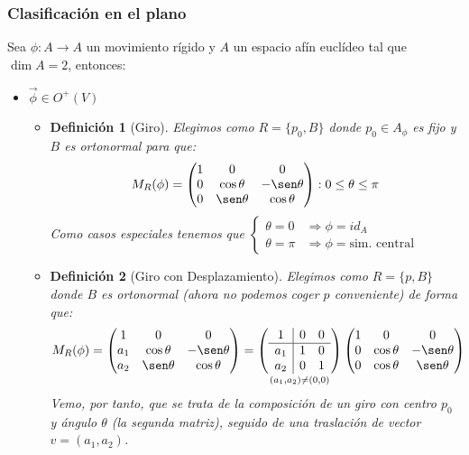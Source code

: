 \documentclass[10pt,a4paper,openright]{book}
\theoremstyle{break}
\newtheorem*{defi}{Definición}
\begin{document}
\subsubsection{Clasificación en el plano}
Sea $\phi : A \to A $ un movimiento rígido y $A$ un espacio afín euclídeo tal que $\dim A = 2$, entonces:
\begin{itemize}
\item $\boxed{\vec{\phi} \in O^+(V)}$
	\begin{itemize}
	\item {}
	
	\begin{defi}[Giro]
	Elegimos como $R=\{p_0, B\}$ donde $p_0\in A_\phi$ es fijo y $B$ es ortonormal para que:
	$$M_R (\phi) = \begin{pmatrix} 1 & 0 & 0 \\ 0 & \cos\theta & -\sen\theta \\ 0 & \sen\theta & \cos\theta \\ \end{pmatrix} : 0 \leq \theta \leq \pi$$
 	Como casos especiales tenemos que $\begin{cases} \theta = 0  & \Rightarrow \phi = id_A  \\ \theta = \pi & \Rightarrow \phi = \mbox{sim. central}\end{cases}$
 	\end{defi}

	\item {}
	
	\begin{defi}[Giro con Desplazamiento]
	Elegimos como $R=\{p, B\}$ donde $B$ es ortonormal (ahora no podemos coger $p$ conveniente) de forma que:
	$$M_R (\phi) = \begin{pmatrix} 1 & 0 & 0 \\ a_1 & \cos\theta & -\sen\theta \\ a_2 & \sen\theta & \cos\theta \\ \end{pmatrix} = \underset{(a_1, a_2) \neq (0,0)}{\left(\begin{array}{c|cc} 1 & 0  & 0  \\ \hline a_1 & 1 & 0 \\ a_2 & 0 & 1 \\ \end{array} \right) } \begin{pmatrix} 1 & 0 & 0 \\ 0 & \cos\theta & -\sen\theta \\ 0 & \cos\theta & \sen\theta \\ \end{pmatrix} $$	
	Vemo, por tanto, que se trata de la composición de un giro con centro $p_0$ y ángulo $\theta$ (la segunda matriz), seguido de una traslación de vector $v = (a_1,a_2)$.
	\end{defi}
	\end{itemize}
		

\end{itemize}
\end{document}
